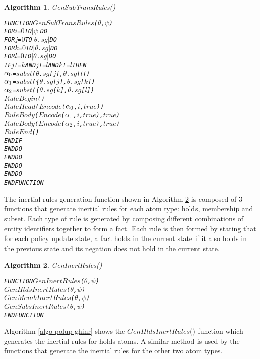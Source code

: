 \documentclass[11pt]{report}
\newenvironment{vverbatim}
{
  \begin{alltt}
}
{
    \vspace{-\baselineskip}
  \end{alltt}
}
\newtheorem{vvalgorithm}{Algorithm}[chapter]
\newenvironment{valgorithm}[2]
{
  \begin{vvalgorithm}{#1}
    \label{#2}
    \small
    \begin{vverbatim}
}
{
    \end{vverbatim}
  \end{vvalgorithm}
}
\begin{document}
          \begin{valgorithm}{GenSubTransRules()}{algo-polup-gstrr}
FUNCTION \(GenSubTransRules\)(\(\theta\), \(\psi\))
  FOR \(i\) = \(0\) TO \(|\psi|\) DO
    FOR \(j\) = \(0\) TO \(|\)\(\theta\).\(sg\)\(|\) DO
      FOR \(k\) = \(0\) TO \(|\)\(\theta\).\(sg\)\(|\) DO
        FOR \(l\) = \(0\) TO \(|\)\(\theta\).\(sg\)\(|\) DO
          IF \(j\) != \(k\) AND \(j\) != \(l\) AND \(k\) != \(l\) THEN
            \(\alpha\sb{0}\) = \(subst\)(\(\theta\).\(sg\)[\(j\)], \(\theta\).\(sg\)[\(l\)])
            \(\alpha\sb{1}\) = \(subst\)(\{\(\theta\).\(sg\)[\(j\)], \(\theta\).\(sg\)[\(k\)])
            \(\alpha\sb{2}\) = \(subst\)(\{\(\theta\).\(sg\)[\(k\)], \(\theta\).\(sg\)[\(l\)])
            \(RuleBegin\)()
            \(RuleHead\)(\(Encode\)(\(\alpha\sb{0}\), \(i\), \(true\)))
            \(RuleBody\)(\(Encode\)(\(\alpha\sb{1}\), \(i\), \(true\)), \(true\))
            \(RuleBody\)(\(Encode\)(\(\alpha\sb{2}\), \(i\), \(true\)), \(true\))
            \(RuleEnd\)()
          ENDIF
        ENDDO
      ENDDO
    ENDDO
  ENDDO
ENDFUNCTION
          \end{valgorithm}

          The inertial rules generation function shown in Algorithm
          \ref{algo-polup-giner} is composed of 3 functions that generate
          inertial rules for each atom type: holds, membership and
          subset. Each type of rule is generated by composing
          different combinations of entity identifiers together to form a fact.
          Each rule is then formed by stating that for each policy update
          state, a fact holds in the current state if it also holds in the
          previous state and its negation does not hold in the current state.

          \begin{valgorithm}{GenInertRules()}{algo-polup-giner}
FUNCTION \(GenInertRules\)(\(\theta\), \(\psi\))
  \(GenHldsInertRules\)(\(\theta\), \(\psi\))
  \(GenMembInertRules\)(\(\theta\), \(\psi\))
  \(GenSubsInertRules\)(\(\theta\), \(\psi\))
ENDFUNCTION
          \end{valgorithm}

          Algorithm \ref{algo-polup-ghinr} shows the $GenHldsInertRules$()
          function which generates the inertial rules for holds atoms. A
          similar method is used by the functions that generate the inertial
          rules for the other two atom types.
\end{document}

